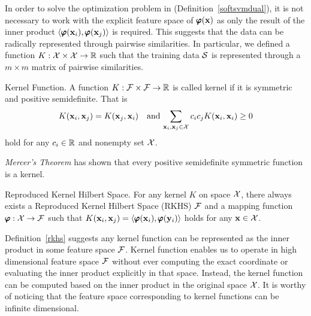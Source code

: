 {In order to solve the optimization problem in (Definition~\ref{softsvmdual}), it is not necessary to work with the explicit feature space of $\pmb \varphi(\mathbf {x})$ as only the result of the inner product $\langle \pmb \varphi(\mathbf {x}_i), \pmb \varphi(\mathbf {x}_j) \rangle$ is required.
This suggests that the data can be radically represented through pairwise similarities.
In particular, we defined a function $K:\mathcal{X}\times\mathcal{X}\rightarrow\mathbb{R}$ such that the training data $\mathcal{S}$ is represented through a $m\times m$ matrix of pairwise similarities.
\begin{definition}{Kernel Function.}
 	A function $K:\mathcal{F}\times\mathcal{F}\rightarrow\mathbb{R}$ is called kernel if it is symmetric and positive semidefinite. That is 
\begin{align*}
	K(\mathbf {x}_i,\mathbf {x}_j) = K(\mathbf {x}_j,\mathbf {x}_i)\quad \text{and}\, \sum_{\mathbf {x}_i,\mathbf {x}_j\in\mathcal{X}}c_ic_jK(\mathbf {x}_i,\mathbf {x}_i)\ge0
\end{align*}
hold for any $c_i\in\mathbb{R}$ and nonempty set $\mathcal{X}$.
\end{definition}
\textit{Mercer's Theorem} \citep{taylor04} has shown that every positive semidefinite symmetric function is a kernel.
\begin{definition}{Reproduced Kernel Hilbert Space.} \label{rkhs}
	For any kernel $K$ on space $\mathcal{X}$, there always exists a Reproduced Kernel Hilbert Space (RKHS) $\mathcal{F}$ and a mapping function $\pmb \varphi:\mathcal{X}\rightarrow\mathcal{F}$ such that $K(\mathbf {x}_i,\mathbf {x}_j)=\langle \pmb \varphi(\mathbf {x}_i), \pmb \varphi(\mathbf {y}_i) \rangle$ holds for any $\mathbf {x}\in\mathcal{X}$.
\end{definition}
Definition~\ref{rkhs} suggests any kernel function can be represented as the inner product in some feature space $\mathcal{F}$.
Kernel function enables us to operate in high dimensional feature space $\mathcal{F}$ without ever computing the exact coordinate or evaluating the inner product explicitly in that space.
Instead, the kernel function can be computed based on the inner product in the original space $\mathcal{X}$.
It is worthy of noticing that the feature space corresponding to kernel functions can be infinite dimensional. 

}
